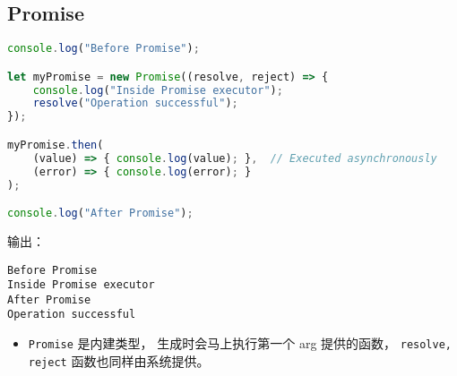 

\subsection{Promise}
\begin{lstlisting}[language=js]
console.log("Before Promise");

let myPromise = new Promise((resolve, reject) => {
    console.log("Inside Promise executor");
    resolve("Operation successful");
});

myPromise.then(
    (value) => { console.log(value); },  // Executed asynchronously
    (error) => { console.log(error); }
);

console.log("After Promise");
\end{lstlisting}
输出：
\begin{lstlisting}[language=none]
Before Promise
Inside Promise executor
After Promise
Operation successful
\end{lstlisting}

\begin{itemize}
\item \verb`Promise` 是内建类型， 生成时会马上执行第一个 arg 提供的函数， \verb`resolve, reject` 函数也同样由系统提供。
\end{itemize}
